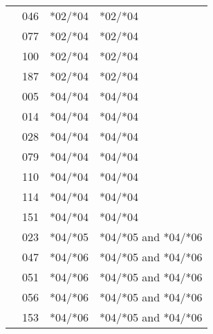 \documentclass[
]{article}
\begin{document}
\begin{table}[!h]
\begin{tabular}[t]{l>{}l|ll}
\hspace{1em} & 046 & *02/*04 & *02/*04\\

\hspace{1em} & 077 & *02/*04 & *02/*04\\

\hspace{1em} & 100 & *02/*04 & *02/*04\\

\hspace{1em} & 187 & *02/*04 & *02/*04\\

\hspace{1em} & 005 & *04/*04 & *04/*04\\

\hspace{1em} & 014 & *04/*04 & *04/*04\\

\hspace{1em} & 028 & *04/*04 & *04/*04\\

\hspace{1em} & 079 & *04/*04 & *04/*04\\

\hspace{1em} & 110 & *04/*04 & *04/*04\\

\hspace{1em} & 114 & *04/*04 & *04/*04\\

\hspace{1em} & 151 & *04/*04 & *04/*04\\

\hspace{1em} & 023 & *04/*05 & *04/*05 and *04/*06\\

\hspace{1em} & 047 & *04/*06 & *04/*05 and *04/*06\\

\hspace{1em} & 051 & *04/*06 & *04/*05 and *04/*06\\

\hspace{1em} & 056 & *04/*06 & *04/*05 and *04/*06\\

\hspace{1em} & 153 & *04/*06 & *04/*05 and *04/*06\\


\end{tabular}
\end{table}
\end{document}

